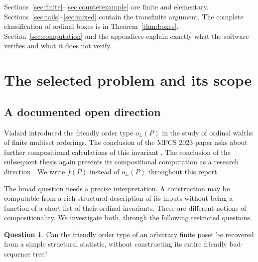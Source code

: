 \documentclass[11pt,letterpaper]{article}
\theoremstyle{definition}
\newtheorem{question}[theorem]{Question}
\theoremstyle{remark}
\begin{document}
\begin{titlepage}
\vfill
{}
\end{titlepage}

\tableofcontents
\vspace{1em}
\begin{resultbox}[title={\bfseries Reading guide}]
Sections~\ref{sec:finite}--\ref{sec:counterexample} are finite and elementary.
Sections~\ref{sec:tails}--\ref{sec:mixed} contain the transfinite argument.
The complete classification of ordinal boxes is in
Theorem~\ref{thm:boxes}. Section~\ref{sec:computation} and the appendices
explain exactly what the software verifies and what it does not verify.
\end{resultbox}
\clearpage

\section{The selected problem and its scope}\label{sec:scope}

\subsection{A documented open direction}
Vialard introduced the friendly order type $o_\perp(P)$ in the study of
ordinal widths of finite multiset orderings. The conclusion of the MFCS
2023 paper asks about further compositional calculations of this invariant
\cite[Conclusion, p.~87:11]{Vialard2023}. The conclusion of the subsequent
thesis again presents its compositional computation as a research direction
\cite[Conclusion, p.~109]{VialardThesis}. We write $f(P)$ instead of
$o_\perp(P)$ throughout this report.

The broad question needs a precise interpretation. A construction may be
computable from a rich structural description of its inputs without being
a function of a short list of their ordinal invariants. These are different
notions of compositionality. We investigate both, through the following
restricted questions.

\begin{question}\label{q:finite}
Can the friendly order type of an arbitrary finite poset be recovered
from a simple structural statistic, without constructing its entire
friendly bad-sequence tree?
\end{question}
\end{document}
